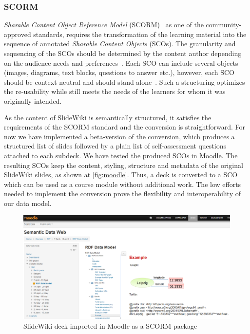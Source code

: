 \documentclass[ngerman,UKenglish,table]{scrbook}
\begin{document}
\subsubsection{SCORM}
\label{sec:SCORM}

\emph{Sharable Content Object Reference Model} (SCORM)~\cite{scorm_specification2011} as one of the community-approved standards, requires the transformation of the learning material into the sequence of annotated \emph{Sharable Content Objects} (SCOs).
The granularity and sequencing of the SCOs should be determined by the content author depending on the audience needs and preferences~\cite{scorm2011}.
Each SCO can include several objects (images, diagrams, text blocks, questions to answer etc.), however, each SCO should be context neutral and should stand alone~\cite{Melon2004}.
Such a structuring optimizes the re-usability while still meets the needs of the learners for whom it was originally intended.

As the content of SlideWiki is semantically structured, it satisfies the requirements of the SCORM standard and the conversion is straightforward.
For now we have implemented a beta-version of the conversion, which produces a structured list of slides followed by a plain list of self-assessment questions attached to each subdeck.
We have tested the produced SCOs in Moodle.
The resulting SCOs keep the content, styling, structure and metadata of the original SlideWiki slides, as shown at \autoref{fig:moodle}.
Thus, a deck is converted to a SCO which can be used as a course module without additional work.
The low efforts needed to implement the conversion prove the flexibility and interoperability of our data model. 

\begin{figure}[!Ht]
	\centering
		\includegraphics[width=\textwidth]{Images/moodle.png}
	\caption{SlideWiki deck imported in Moodle as a SCORM package}
	\label{fig:moodle}
\end{figure}
\end{document}
